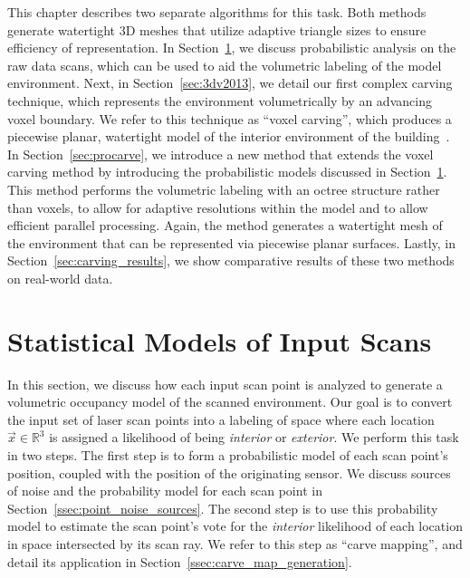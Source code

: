 \documentclass[12pt,onecolumn,oneside]{book}
\begin{document}
This chapter describes two separate algorithms for this task.  Both methods generate watertight 3D meshes that utilize adaptive triangle sizes to ensure efficiency of representation.  In Section~\ref{sec:fss_stats}, we discuss probabilistic analysis on the raw data scans, which can be used to aid the volumetric labeling of the model environment.  Next, in Section~\ref{sec:3dv2013}, we detail our first complex carving technique, which represents the environment volumetrically by an advancing voxel boundary.  We refer to this technique as ``voxel carving'', which produces a piecewise planar, watertight model of the interior environment of the building~\cite{Turner13}.  In Section~\ref{sec:procarve}, we introduce a new method that extends the voxel carving method by introducing the probabilistic models discussed in Section~\ref{sec:fss_stats}.  This method performs the volumetric labeling with an octree structure rather than voxels, to allow for adaptive resolutions within the model and to allow efficient parallel processing.  Again, the method generates a watertight mesh of the environment that can be represented via piecewise planar surfaces.  Lastly, in Section~\ref{sec:carving_results}, we show comparative results of these two methods on real-world data.

\section{Statistical Models of Input Scans}
\label{sec:fss_stats}


In this section, we discuss how each input scan point is analyzed to generate a volumetric occupancy model of the scanned environment.  Our goal is to convert the input set of laser scan points into a labeling of space where each location $\vec{x} \in \mathbb{R}^3$ is assigned a likelihood of being {\it interior} or {\it exterior}.  We perform this task in two steps.  The first step is to form a probabilistic model of each scan point's position, coupled with the position of the originating sensor.  We discuss sources of noise and the probability model for each scan point in Section~\ref{ssec:point_noise_sources}.  The second step is to use this probability model to estimate the scan point's vote for the {\it interior} likelihood of each location in space intersected by its scan ray.  We refer to this step as ``carve mapping'', and detail its application in Section~\ref{ssec:carve_map_generation}.  
\end{document}

